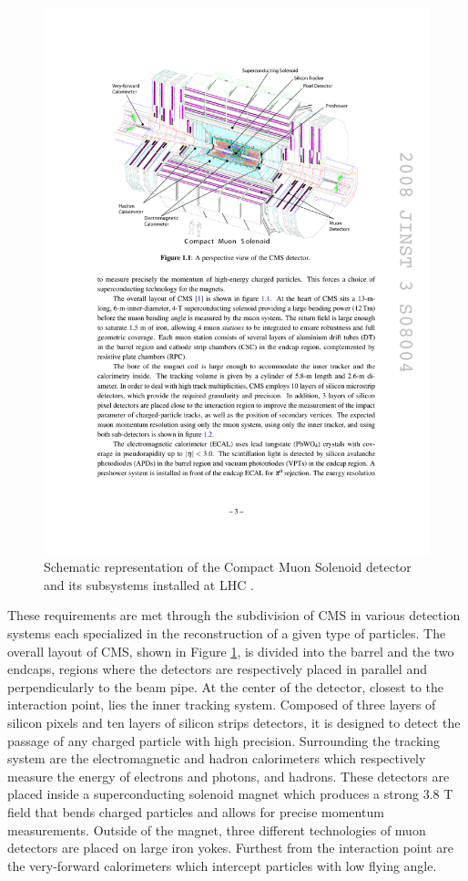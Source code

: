    \begin{figure}[h!]
      \centering
      \includegraphics[width=\textwidth]{img/I-3-cms/cms.pdf}
      \caption{Schematic representation of the Compact Muon Solenoid detector and its subsystems installed at LHC \cite{1748-0221-3-08-S08004}.}
      \label{fig:I-3-cms-global-view}
    \end{figure}

    These requirements are met through the subdivision of CMS in various detection systems each specialized in the reconstruction of a given type of particles. The overall layout of CMS, shown in Figure \ref{fig:I-3-cms-global-view}, is divided into the barrel and the two endcaps, regions where the detectors are respectively placed in parallel and perpendicularly to the beam pipe. At the center of the detector, closest to the interaction point, lies the inner tracking system. Composed of three layers of silicon pixels and ten layers of silicon strips detectors, it is designed to detect the passage of any charged particle with high precision. Surrounding the tracking system are the electromagnetic and hadron calorimeters which respectively measure the energy of electrons and photons, and hadrons. These detectors are placed inside a superconducting solenoid magnet which produces a strong 3.8 T field that bends charged particles and allows for precise momentum measurements. Outside of the magnet, three different technologies of muon detectors are placed on large iron yokes. Furthest from the interaction point are the very-forward calorimeters which intercept particles with low flying angle. \\


